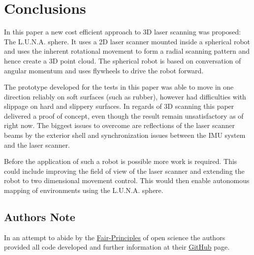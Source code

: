 \section{Conclusions}
\label{sec:conclusions}

In this paper a new cost efficient approach to 3D laser scanning was proposed: The L.U.N.A. sphere. It uses a 2D laser scanner mounted inside a spherical robot and uses the inherent rotational movement to form a radial scanning pattern and hence create a 3D point cloud. The spherical robot is based on conversation of angular momentum and uses flywheels to drive the robot forward. 

The prototype developed for the tests in this paper was able to move in one direction reliably on soft surfaces (such as rubber), however had difficulties with slippage on hard and slippery surfaces. In regards of 3D scanning this paper delivered a proof of concept, even though the result remain unsatisfactory as of right now. The biggest issues to overcome are reflections of the laser scanner beams by the exterior shell and synchronization issues between the IMU system and the laser scanner. 

Before the application of such a robot is possible more work is required. This could include improving the field of view of the laser scanner and extending the robot to two dimensional movement control. This would then enable autonomous mapping of environments using the L.U.N.A. sphere. 

\subsection*{Authors Note}

In an attempt to abide by the \href{https://www.go-fair.org/fair-principles}{Fair-Principles} of open science the authors provided all code developed and further information at their \href{https://github.com/fallow24/L.U.N.A}{GitHub} page.